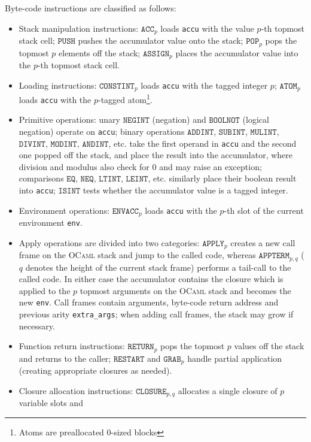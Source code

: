 \documentclass[10pt,a4paper,twocolumn]{article}
\begin{document}
Byte-code instructions are classified as follows:
\begin{itemize}
\item Stack manipulation instructions: $\mathtt{ACC}_p$ loads \texttt{accu} with the value $p$-th topmost stack
  cell; $\mathtt{PUSH}$ pushes the accumulator value onto the stack; $\mathtt{POP}_p$ pops the topmost $p$ elements
  off the stack; $\mathtt{ASSIGN}_p$ places the accumulator value into the $p$-th topmost stack cell.
\item Loading instructions: $\mathtt{CONSTINT}_p$ loads \texttt{accu} with the tagged integer $p$;
  $\mathtt{ATOM}_p$ loads \texttt{accu} with the $p$-tagged atom\footnote{Atoms are preallocated $0$-sized
    blocks}.
\item Primitive operations: unary $\mathtt{NEGINT}$ (negation) and $\mathtt{BOOLNOT}$ (logical negation)
  operate on \texttt{accu}; binary operations $\mathtt{ADDINT}$, $\mathtt{SUBINT}$, $\mathtt{MULINT}$,
  $\mathtt{DIVINT}$, $\mathtt{MODINT}$, $\mathtt{ANDINT}$, etc. take the first operand in \texttt{accu}
  and the second one popped off the stack, and place the result into the accumulator, where division and
  modulus also check for $0$ and may raise an exception; comparisons $\mathtt{EQ}$, $\mathtt{NEQ}$,
  $\mathtt{LTINT}$, $\mathtt{LEINT}$, etc. similarly place their boolean result into \texttt{accu};
  $\texttt{ISINT}$ tests whether the accumulator value is a tagged integer.
\item Environment operations: $\mathtt{ENVACC}_p$ loads \texttt{accu} with the $p$-th slot of
  the current environment \texttt{env}.
\item Apply operations are divided into two categories: $\mathtt{APPLY}_p$ creates a new call frame on
  the \textsc{OCaml} stack and jump to the called code, whereas $\mathtt{APPTERM}_{p,q}$ ($q$ denotes the
  height of the current stack frame) performs a tail-call to the called code. In either case the accumulator
  contains the closure which is applied to the $p$ topmost arguments on the \textsc{OCaml} stack and becomes
  the new \texttt{env}. Call frames contain arguments, byte-code return address and previous arity
  \texttt{extra\_args}; when adding call frames, the stack may grow if necessary.
\item Function return instructions: $\mathtt{RETURN}_p$ pops the topmost $p$ values off the stack and
  returns to the caller; $\mathtt{RESTART}$ and $\mathtt{GRAB}_p$ handle partial application (creating
  appropriate closures as needed).
\item Closure allocation instructions: $\mathtt{CLOSURE}_{p,q}$ allocates a single closure of $p$ variable slots and

\end{itemize}
\end{document}
